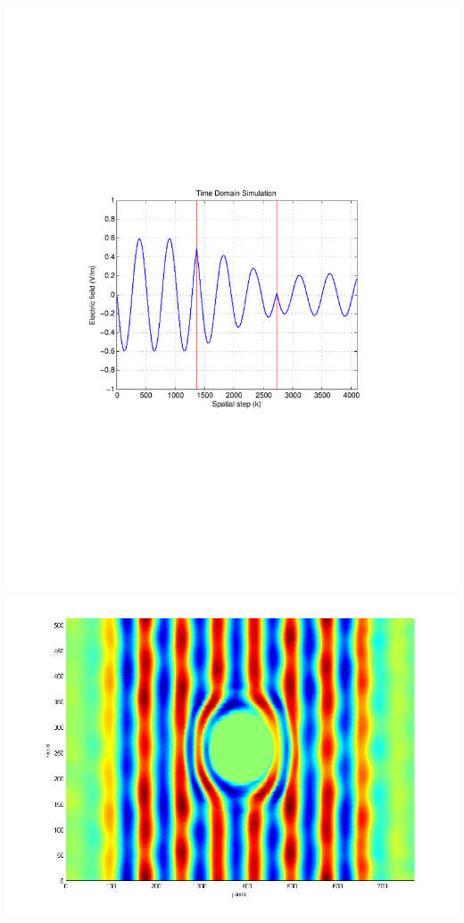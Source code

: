 \documentclass[portrait,final,a1paper,fontscale=0.4]{baposter}
\begin{document}
\begin{poster}
{\centering\includegraphics[scale=0.38, trim=3.5cm 8.7cm 4.5cm 8.75cm, clip]{Figures/FigCh03_1DDNGSteadyStateLossy.pdf}
\centering\includegraphics[scale=0.22]{Figures/FigCh05_Ez_Cloak_SteadyStateLossless.png}
}
\end{poster}
\end{document}
